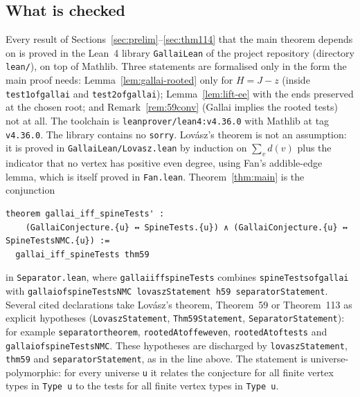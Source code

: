 \documentclass[11pt]{amsart}
\theoremstyle{definition}
\theoremstyle{remark}
\renewcommand{\_}{\oldunderscore\allowbreak}
\begin{document}
\subsection{What is checked}
Every result of Sections~\ref{sec:prelim}--\ref{sec:thm114} that the main theorem depends on is
proved in the Lean~4 library \texttt{GallaiLean} of the project repository (directory \texttt{lean/}),
on top of Mathlib. Three statements are formalised only in the form the main proof needs:
Lemma~\ref{lem:gallai-rooted} only for $H=J-z$ (inside \texttt{test1\_of\_gallai} and
\texttt{test2\_of\_gallai}); Lemma~\ref{lem:lift-ee} with the ends preserved at the chosen root; and
Remark~\ref{rem:59conv} (Gallai implies the rooted tests) not at all. The
toolchain is \texttt{leanprover/lean4:v4.36.0} with Mathlib at tag \texttt{v4.36.0}. The library
contains no \texttt{sorry}. Lov\'asz's theorem is not an assumption: it is proved in
\texttt{GallaiLean/Lovasz.lean} by induction on $\sum_v d(v)$ plus the indicator that no vertex has
positive even degree, using Fan's addible-edge lemma,
which is itself proved in \texttt{Fan.lean}. Theorem~\ref{thm:main} is the conjunction
{\footnotesize
\begin{verbatim}
theorem gallai_iff_spineTests' :
    (GallaiConjecture.{u} ↔ SpineTests.{u}) ∧ (GallaiConjecture.{u} ↔ SpineTestsNMC.{u}) :=
  gallai_iff_spineTests thm59
\end{verbatim}
}
in \texttt{Separator.lean}, where \texttt{gallai\_iff\_spineTests} combines
\texttt{spineTests\_of\_gallai} with \texttt{gallai\_of\_spineTestsNMC lovaszStatement h59
separatorStatement}. Several cited declarations take Lov\'asz's theorem, Theorem~59 or Theorem~113 as explicit hypotheses
(\texttt{LovaszStatement}, \texttt{Thm59Statement}, \texttt{SeparatorStatement}): for example
\texttt{separator\_theorem}, \texttt{rootedAt\_of\_few\_even}, \texttt{rootedAt\_of\_tests} and
\texttt{gallai\_of\_spineTestsNMC}. These hypotheses are discharged by \texttt{lovaszStatement},
\texttt{thm59} and \texttt{separatorStatement}, as in the line above. The statement is
universe-polymorphic: for every universe \texttt{u} it relates
the conjecture for all finite vertex types in \texttt{Type u} to the tests for all finite vertex types
in \texttt{Type u}.
\end{document}

